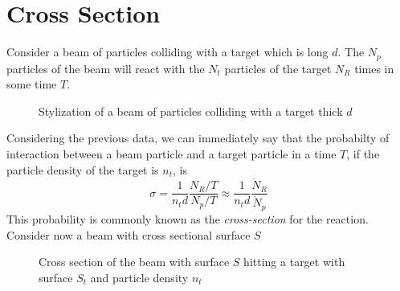 \documentclass[../qm.tex]{subfiles}
\begin{document}
\section{Cross Section}
Consider a beam of particles colliding with a target which is long $d$. The $N_p$ particles of the beam will react with the $N_t$ particles of the target $N_R$ times in some time $T$.\\
\begin{figure}[H]
	\centering
	\caption{Stylization of a beam of particles colliding with a target thick $d$}
	\label{fig:scatteringex}
\end{figure}
Considering the previous data, we can immediately say that the probabilty of interaction between a beam particle and a target particle in a time $T$, if the particle density of the target is $n_t$, is
\begin{equation}
	\sigma=\frac{1}{n_td}\frac{N_R/T}{N_p/T}\approx\frac{1}{n_td}\frac{\dot{N}_R}{\dot{N}_p}%
	\label{eq:csfirst}
\end{equation}
This probability is commonly known as the \emph{cross-section} for the reaction.\vfill\newpage
Consider now a beam with cross sectional surface $S$\\
\begin{minipage}{0.5\linewidth}
	\begin{figure}[H]
		\centering
		\caption{Cross section of the beam with surface $S$ hitting a target with surface $S_t$ and particle density $n_t$}
		\label{fig:csbeamscatter}
	\end{figure}
\end{minipage}
\end{document}
